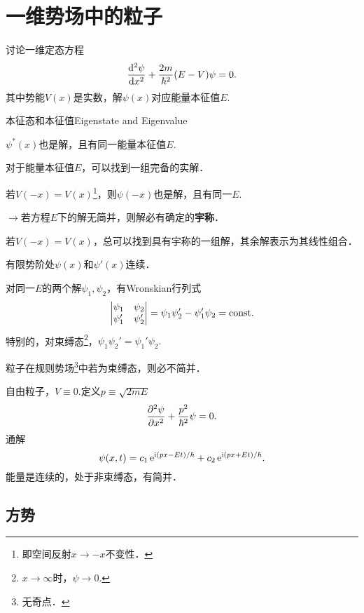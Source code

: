 \chapter[一维势场]{一维势场中的粒子}
讨论一维定态方程
\begin{align}
	\dv[2]\psi{x}+\frac{2m}{\hbar^2}(E-V)\psi=0.
\end{align}
其中势能$V(x)$是实数，解$\psi(x)$对应能量本征值$E.$
\begin{theorem}{本征态和本征值}{Eigenstate and Eigenvalue}
	\begin{compactenum}
		\item $\psi^*(x)$也是解，且有同一能量本征值$E.$
		\item 对于能量本征值$E$，可以找到一组完备的实解．
		\item 若$V(-x)=V(x)$\footnote{即空间反射$x\to-x$不变性．}，则$\psi(-x)$也是解，且有同一$E.$

		$\to$若方程$E$下的解无简并，则解必有确定的\textbf{宇称}．
		\item 若$V(-x)=V(x)$，总可以找到具有宇称的一组解，其余解表示为其线性组合．
		\item 有限势阶处$\psi(x)$和$\psi'(x)$连续．
		\item 对同一$E$的两个解$\psi_1,\psi_2$，有Wronskian行列式
		\renewcommand\arraystretch{1}
		\begin{align*}
			\begin{vmatrix}
				\psi_1  & \psi_2  \\
				\psi_1' & \psi_2'
			\end{vmatrix}=\psi_1\psi_2'-\psi_1'\psi_2=\const.
		\end{align*}
		\renewcommand\arraystretch{.82}
		特别的，对束缚态\footnote{$x\to\infty$时，$\psi\to 0.$}，$\psi_1\psi_2'=\psi_1'\psi_2.$
		\item 粒子在规则势场\footnote{无奇点．}中若为束缚态，则必不简并．
	\end{compactenum}
\end{theorem}
自由粒子，$V\equiv 0.$定义$p\equiv\sqrt{2mE}$
\[
	\pv[2]\psi{x}+\frac{p^2}{\hbar^2}\psi=0.
\]
通解
\[
	\psi(x,t)=c_1\e{\i(px-Et)/\hbar}+c_2\e{\i(px+Et)/\hbar}.
\]
能量是连续的，处于非束缚态，有简并．

\section{方势}
